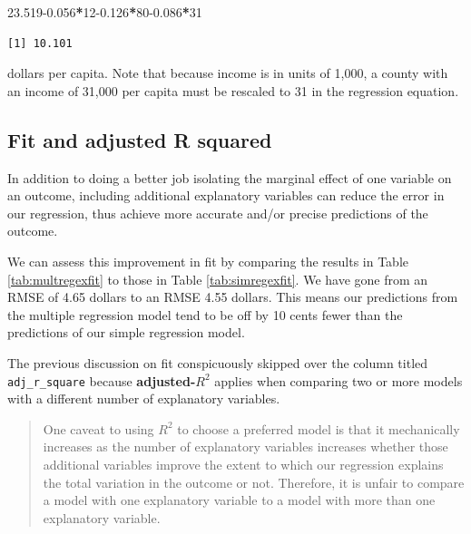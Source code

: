 \documentclass[
]{book}
\makeatletter
\newenvironment{Shaded}{\begin{snugshade}}{\end{snugshade}}
\newcommand{\DecValTok}[1]{\textcolor[rgb]{0.06,0.06,0.06}{#1}}
\newcommand{\FloatTok}[1]{\textcolor[rgb]{0.06,0.06,0.06}{#1}}
\newcommand{\SpecialCharTok}[1]{\textcolor[rgb]{0.43,0.43,0.43}{\textbf{#1}}}
\newenvironment{kframe}{%
\medskip{}
\setlength{\fboxsep}{.8em}
 \def\at@end@of@kframe{}%
 \ifinner\ifhmode%
  \def\at@end@of@kframe{\end{minipage}}%
  \begin{minipage}{\columnwidth}%
 \fi\fi%
 \def\FrameCommand##1{\hskip\@totalleftmargin \hskip-\fboxsep
 \colorbox{shadecolor}{##1}\hskip-\fboxsep
     \hskip-\linewidth \hskip-\@totalleftmargin \hskip\columnwidth}%
 \MakeFramed {\advance\hsize-\width
   \@totalleftmargin\z@ \linewidth\hsize
   \@setminipage}}%
 {\par\unskip\endMakeFramed%
 \at@end@of@kframe}
\renewenvironment{Shaded}{\begin{kframe}}{\end{kframe}}
\makeatother
\begin{document}
\begin{Shaded}
\begin{Highlighting}[]
\FloatTok{23.519{-}0.056}\SpecialCharTok{*}\DecValTok{12}\FloatTok{{-}0.126}\SpecialCharTok{*}\DecValTok{80}\FloatTok{{-}0.086}\SpecialCharTok{*}\DecValTok{31}
\end{Highlighting}
\end{Shaded}

\begin{verbatim}
[1] 10.101
\end{verbatim}

dollars per capita. Note that because income is in units of 1,000, a county with an income of 31,000 per capita must be rescaled to 31 in the regression equation.

\hypertarget{fit-and-adjusted-r-squared}{%
\subsection{Fit and adjusted R squared}\label{fit-and-adjusted-r-squared}}

In addition to doing a better job isolating the marginal effect of one variable on an outcome, including additional explanatory variables can reduce the error in our regression, thus achieve more accurate and/or precise predictions of the outcome.

We can assess this improvement in fit by comparing the results in Table \ref{tab:multregexfit} to those in Table \ref{tab:simregexfit}. We have gone from an RMSE of 4.65 dollars to an RMSE 4.55 dollars. This means our predictions from the multiple regression model tend to be off by 10 cents fewer than the predictions of our simple regression model.

The previous discussion on fit conspicuously skipped over the column titled \texttt{adj\_r\_square} because \textbf{adjusted-\(R^2\)} applies when comparing two or more models with a different number of explanatory variables.

\begin{quote}
One caveat to using \(R^2\) to choose a preferred model is that it mechanically increases as the number of explanatory variables increases whether those additional variables improve the extent to which our regression explains the total variation in the outcome or not. Therefore, it is unfair to compare a model with one explanatory variable to a model with more than one explanatory variable.
\end{quote}
\end{document}
